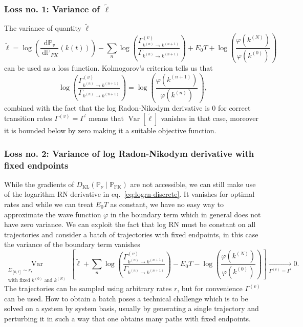 \subsubsection{Loss no. 1: Variance of $\tilde \ell$}
The variance of quantity $\tilde{\ell}$
\begin{equation}
	\tilde{\ell}=
	\log \left(\frac{\mathrm{d} \mathbb{P}_{v}}{\mathrm{~d} \mathbb{P}_{F K}}(k(t))\right)
	-\sum_{n} \log \left(\frac{\Gamma^{(v)}_{k^{(n)} \rightarrow k^{(n+1)}}}{\Gamma_{k^{(n)} \rightarrow k^{(n+1)}}}\right)
	+E_{0} T
	+\log \left(\frac{\varphi\left(k^{(N)}\right)}{\varphi\left(k^{(0)}\right)}\right)
\end{equation}
 can be used as a loss function. Kolmogorov's criterion tells us that
 \begin{equation}
 	\log \left(\frac{\Gamma_{k^{(n)} \rightarrow k^{(n+1)}}^{(v)}}{\Gamma_{k^{(n)} \rightarrow k^{(n+1)}}}\right)=\log \left(\frac{\varphi(k^{(n+1)})}{\varphi(k^{(n)})}\right),
 \end{equation}
 combined with the fact that the log Radon-Nikodym derivative is $0$ for correct transition rates $\Gamma^{(v)} = \Gamma^\prime$ means that $\operatorname{Var}[\tilde{\ell}]$ vanishes in that case, moreover it is bounded below by zero making it a suitable objective function. 
 
\subsubsection{Loss no. 2: Variance of log Radon-Nikodym derivative with fixed endpoints}
While the gradients of $D_{\mathrm{KL}}\left(\mathbb{P}_{\nu} \mid \mathbb{P}_{\mathrm{FK}}\right)$ are not accessible, we can still make use of the logarithm RN derivative in eq.~\eqref{eq:logrn-discrete}. It vanishes for optimal rates and while we can treat $E_0 T$ as constant, we have no easy way to approximate the wave function $\varphi$ in the boundary term which in general does not have zero variance. We can exploit the fact that log RN must be constant on all trajectories and consider a batch of trajectories with fixed endpoints, in this case the variance of the boundary term vanishes
\begin{equation}
\underset{\substack{\Sigma_{[0, t]} \sim r, \\ \text{with fixed } k^{(0)} \text{ and } k^{(N)}}}{\operatorname{Var}}\left[\tilde \ell
+\sum_{n} \log \left(\frac{\Gamma_{k^{(n)} \rightarrow k^{(n+1)}}^{(v)}}{\Gamma_{k^{(n)} \rightarrow k^{(n+1)}}}\right)-E_{0} T-\log \left(\frac{\varphi(k^{(N)})}{\varphi(k^{(0)})}\right)
\right] \underset{\Gamma^{(v)} = \Gamma^\prime}{\rightarrow} 0.
\end{equation}
The trajectories can be sampled using arbitrary rates $r$, but for convenience $\Gamma^{(v)}$ can be used. How to obtain a batch poses a technical challenge which is to be solved on a system by system basis, usually by generating a single trajectory and perturbing it in such a way that one obtains many paths with fixed endpoints.


